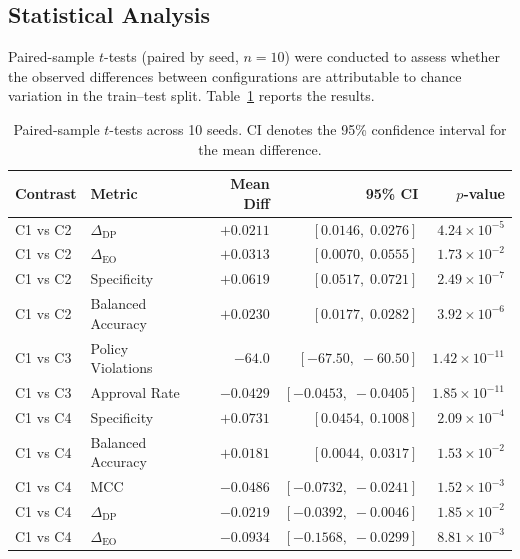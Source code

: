\subsection{Statistical Analysis}

Paired-sample $t$-tests (paired by seed, $n{=}10$) were conducted to assess
whether the observed differences between configurations are attributable to
chance variation in the train--test split. Table~\ref{tab:paired} reports
the results.

\begin{table}[htbp]
\centering
\caption{Paired-sample $t$-tests across 10 seeds. CI denotes the 95\%
confidence interval for the mean difference.}
\label{tab:paired}
\setlength{\tabcolsep}{3pt}
\footnotesize
\begin{tabular}{llrrr}
\hline
\textbf{Contrast} & \textbf{Metric} & \textbf{Mean Diff} & \textbf{95\% CI} & \textbf{$p$-value} \\
\hline
C1 vs C2 & $\Delta_{\text{DP}}$    & $+0.0211$ & $[0.0146,\; 0.0276]$ & $4.24 \times 10^{-5}$ \\
C1 vs C2 & $\Delta_{\text{EO}}$    & $+0.0313$ & $[0.0070,\; 0.0555]$ & $1.73 \times 10^{-2}$ \\
C1 vs C2 & Specificity             & $+0.0619$ & $[0.0517,\; 0.0721]$ & $2.49 \times 10^{-7}$ \\
C1 vs C2 & Balanced Accuracy       & $+0.0230$ & $[0.0177,\; 0.0282]$ & $3.92 \times 10^{-6}$ \\
\hline
C1 vs C3 & Policy Violations       & $-64.0$   & $[-67.50,\; -60.50]$ & $1.42 \times 10^{-11}$ \\
C1 vs C3 & Approval Rate           & $-0.0429$ & $[-0.0453,\; -0.0405]$ & $1.85 \times 10^{-11}$ \\
\hline
C1 vs C4 & Specificity             & $+0.0731$ & $[0.0454,\; 0.1008]$ & $2.09 \times 10^{-4}$ \\
C1 vs C4 & Balanced Accuracy       & $+0.0181$ & $[0.0044,\; 0.0317]$ & $1.53 \times 10^{-2}$ \\
C1 vs C4 & MCC                     & $-0.0486$ & $[-0.0732,\; -0.0241]$ & $1.52 \times 10^{-3}$ \\
C1 vs C4 & $\Delta_{\text{DP}}$    & $-0.0219$ & $[-0.0392,\; -0.0046]$ & $1.85 \times 10^{-2}$ \\
C1 vs C4 & $\Delta_{\text{EO}}$    & $-0.0934$ & $[-0.1568,\; -0.0299]$ & $8.81 \times 10^{-3}$ \\
\hline
\end{tabular}
\end{table}

